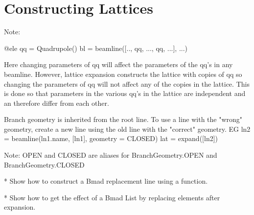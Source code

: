 \chapter{Constructing Lattices}
\label{c:construct-lat}

Note: 
\begin{example}
  @ele qq = Quadrupole()
  bl = beamline([.., qq, ..., qq, ...], ...)
\end{example}
Here changing parameters of qq will affect the parameters of the qq's in any beamline.
However, lattice expansion constructs the lattice with copies of qq so changing the
parameters of qq will not affect any of the copies in the lattice. This is done so that
parameters in the various qq's in the lattice are independent and an therefore differ from each
other. 

Branch geometry is inherited from the root line. To use a line with the "wrong" geometry, create
a new line using the old line with the "correct" geometry. EG
  ln2 = beamline(ln1.name, [ln1], geometry = CLOSED)
  lat = expand([ln2])

Note: OPEN and CLOSED are aliases for BranchGeometry.OPEN and BranchGeometry.CLOSED

* Show how to construct a Bmad replacement line using a function.

* Show how to get the effect of a Bmad List by replacing elements after expansion.